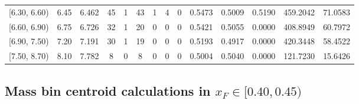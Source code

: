 \begin{table}[htbp]
{\begin{tabular}{cc|c|cccccc|ccc|cc}
        {[6.30, 6.60)} & 6.45 & 6.462 & 45 & 1 & 43 & 1 & 4 & 0 & 0.5473 & 0.5009 & 0.5190 & 459.2042 & 71.0583 \\
        {[6.60, 6.90)} & 6.75 & 6.726 & 32 & 1 & 20 & 0 & 0 & 0 & 0.5421 & 0.5055 & 0.0000 & 408.8949 & 60.7972 \\
        {[6.90, 7.50)} & 7.20 & 7.191 & 30 & 1 & 19 & 0 & 0 & 0 & 0.5193 & 0.4917 & 0.0000 & 420.3448 & 58.4522 \\
        {[7.50, 8.70)} & 8.10 & 7.782 & 8 & 0 & 8 & 0 & 0 & 0 & 0.5004 & 0.5040 & 0.0000 & 121.7230 & 15.6426 \\
        \hline\hline
    \end{tabular}
    }
\end{table}

\clearpage
\subsection{\texorpdfstring{Mass bin centroid calculations in $x_F \in [0.40, 0.45)$}{Mass bin centroid calculations in x\_F in [0.40, 0.45)]}}

